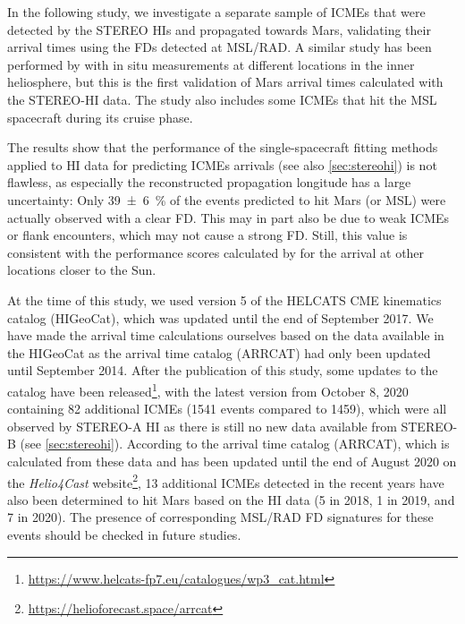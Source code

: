 In the following study, we investigate a separate sample of \acp{ICME} that were detected by the \ac{STEREO} \acp{HI} and propagated towards Mars, validating their arrival times using the \acp{FD} detected at \ac{MSL}/\ac{RAD}. A similar study has been performed by \citet{Moestl-2017-HelcatsHSO} with in situ measurements at different locations in the inner heliosphere, but this is the first validation of Mars arrival times calculated with the \ac{STEREO}-\ac{HI} data. The study also includes some \acp{ICME} that hit the \ac{MSL} spacecraft during its cruise phase.

The results show that the performance of the single-spacecraft fitting methods applied to \ac{HI} data for predicting \acp{ICME} arrivals (see also \autoref{sec:stereohi}) is not flawless, as especially the reconstructed propagation longitude has a large uncertainty: Only \SI{39+-6}{\percent} of the events predicted to hit Mars (or \ac{MSL}) were actually observed with a clear \ac{FD}. This may in part also be due to weak \acp{ICME} or flank encounters, which may not cause a strong \ac{FD}. Still, this value is consistent with the performance scores calculated by \citet{Moestl-2017-HelcatsHSO} for the arrival at other locations closer to the Sun.

At the time of this study, we used version 5 of the \acs{HELCATS} CME kinematics catalog (HIGeoCat), which was updated until the end of September 2017. We have made the arrival time calculations ourselves based on the data available in the HIGeoCat as the arrival time catalog (ARRCAT) had only been updated until September 2014.
After the publication of this study, some updates to the catalog have been released\footnote{\url{https://www.helcats-fp7.eu/catalogues/wp3_cat.html}}, with the latest version from October 8, 2020 containing 82 additional \acp{ICME} (\num{1541} events compared to \num{1459}), which were all observed by \ac{STEREO}-A \ac{HI} as there is still no new data available from \ac{STEREO}-B (see \autoref{sec:stereohi}). According to the arrival time catalog (ARRCAT), which is calculated from these data and has been updated until the end of August 2020 on the \textit{Helio4Cast} website\footnote{\url{https://helioforecast.space/arrcat}}, 13 additional \acp{ICME} detected in the recent years have also been determined to hit Mars based on the \ac{HI} data (5 in 2018, 1 in 2019, and 7 in 2020). The presence of corresponding \ac{MSL}/\ac{RAD} \ac{FD} signatures for these events should be checked in future studies.

